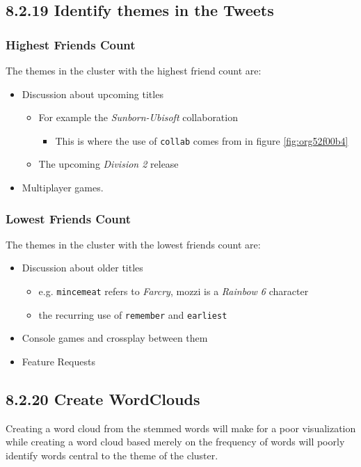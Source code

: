 \documentclass[11pt]{article}
\begin{document}
\subsection{8.2.19 Identify themes in the Tweets}
\label{sec:org5e55b96}
\subsubsection{Highest Friends Count}
\label{sec:org65873b7}
The themes in the cluster with the highest friend count are:

\begin{itemize}
\item Discussion about upcoming titles
\begin{itemize}
\item For example the \emph{Sunborn-Ubisoft} collaboration
\begin{itemize}
\item This is where the use of \texttt{collab} comes from in figure \ref{fig:org52f00b4}
\end{itemize}
\item The upcoming \emph{Division 2} release
\end{itemize}
\item Multiplayer games.
\end{itemize}
\subsubsection{Lowest Friends Count}
\label{sec:org0cf151e}

The themes in the cluster with the lowest friends count are:

\begin{itemize}
\item Discussion about older titles
\begin{itemize}
\item e.g. \texttt{mincemeat} refers to \emph{Farcry}, mozzi is a \emph{Rainbow 6} character
\item the recurring use of \texttt{remember} and \texttt{earliest}
\end{itemize}
\item Console games and crossplay between them
\item Feature Requests
\end{itemize}

\subsection{8.2.20 Create WordClouds}
\label{sec:org4346d50}
Creating a word cloud from the stemmed words will make for a poor visualization
while creating a word cloud based merely on the frequency of words will poorly
identify words central to the theme of the cluster.
\end{document}
